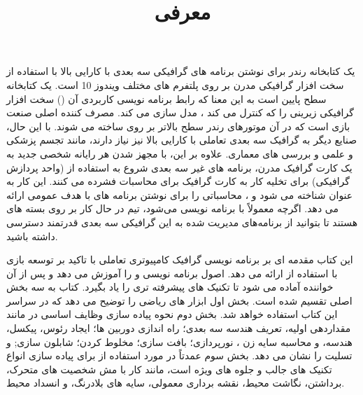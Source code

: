 \newpage

\textbf{\vspace{80pt}}
\title{
    \BTitr
    \center \Huge
    \begin{flushright}
        \textbf{معرفی}
    \end{flushright}
}
\textbf{\vspace{80pt}}

{
    \Large
     یک کتابخانه رندر برای نوشتن برنامه های گرافیکی سه بعدی با کارایی بالا با استفاده از سخت افزار گرافیکی مدرن بر روی پلتفرم های مختلف ویندوز 10  است.
     یک کتابخانه سطح پایین است به این معنا که رابط برنامه نویسی کاربردی آن () سخت افزار گرافیکی زیرینی را که کنترل می کند ، مدل سازی می کند.
مصرف کننده اصلی  صنعت بازی است که در آن موتورهای رندر سطح بالاتر بر روی  ساخته می شوند.
با این حال، صنایع دیگر به گرافیک سه بعدی تعاملی با کارایی بالا نیز نیاز دارند، مانند تجسم پزشکی و علمی و بررسی های معماری.
علاوه بر این، با مجهز شدن هر رایانه شخصی جدید به یک کارت گرافیک مدرن، برنامه های غیر سه بعدی شروع به استفاده از  (واحد پردازش گرافیکی) برای تخلیه کار به کارت گرافیک برای محاسبات فشرده می کنند.
این کار به عنوان  شناخته می شود و  ،  محاسباتی را برای نوشتن برنامه های  با هدف عمومی ارائه می دهد.
اگرچه  معمولاً با   برنامه نویسی می‌شود، تیم   در حال کار بر روی بسته های  هستند تا بتوانید از برنامه‌های مدیریت شده به این  گرافیکی سه بعدی قدرتمند دسترسی داشته باشید.
}

{
    \Large
    این کتاب مقدمه ای بر برنامه نویسی گرافیک کامپیوتری تعاملی با تاکید بر توسعه بازی با استفاده از  ارائه می دهد. اصول برنامه نویسی  و  را آموزش می دهد و پس از آن خواننده آماده می شود تا تکنیک های پیشرفته تری را یاد بگیرد.
    کتاب به سه بخش اصلی تقسیم شده است. بخش اول ابزار های ریاضی را توضیح می دهد که در سراسر این کتاب استفاده خواهد شد.
    بخش دوم نحوه پیاده سازی وظایف اساسی در  مانند مقداردهی اولیه، تعریف هندسه سه بعدی؛ راه اندازی دوربین ها؛ ایجاد رئوس، پیکسل، هندسه، و محاسبه سایه زن ، نورپردازی؛ بافت سازی؛ مخلوط کردن؛ شابلون سازی; و تسلیت را نشان می دهد.
    بخش سوم عمدتاً در مورد استفاده از  برای پیاده سازی انواع تکنیک های جالب و جلوه های ویژه است، مانند کار با مش شخصیت های متحرک، برداشتن، نگاشت محیط، نقشه برداری معمولی، سایه های بلادرنگ، و انسداد محیط.
}

